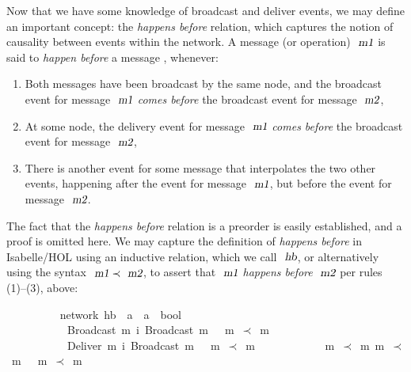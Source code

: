 \documentclass[acmlarge,review,anonymous]{acmart}\settopmatter{printfolios=true}
\begin{document}
Now that we have some knowledge of broadcast and deliver events, we may define an important concept: the \emph{happens before} relation, which captures the notion of causality between events within the network.
A message (or operation) $\isa{m1}$ is said to \emph{happen before} a message , whenever:
\begin{enumerate}
\item
Both messages have been broadcast by the same node, and the broadcast event for message $\isa{m1}$ \emph{comes before} the broadcast event for message $\isa{m2}$,
\item
At some node, the delivery event for message $\isa{m1}$ \emph{comes before} the broadcast event for message $\isa{m2}$,
\item
There is another event for some message that interpolates the two other events, happening after the event for message $\isa{m1}$, but before the event for message $\isa{m2}$.
\end{enumerate}
The fact that the \emph{happens before} relation is a preorder is easily established, and a proof is omitted here.
We may capture the definition of \emph{happens before} in Isabelle/HOL using an inductive relation, which we call $\isa{hb}$, or alternatively using the syntax $\isa{m1} \prec \isa{m2}$, to assert that $\isa{m1}$ \emph{happens before} $\isa{m2}$ per rules (1)--(3), above:
\\
\begin{isabellebody}
\ \ \ \ \ \ \ \  {\isacharparenleft}\ network{\isacharparenright}\ hb\ {\isacharcolon}{\isacharcolon}\ {\isachardoublequoteopen}{\isacharprime}a\ {\isasymRightarrow}\ {\isacharprime}a\ {\isasymRightarrow}\ bool{\isachardoublequoteclose}\ \isanewline
\ \ \ \ \ \ \ \ \ \ {\isachardoublequoteopen}{\isasymlbrakk}\ Broadcast\ m{}\ {\isasymsqsubset}\isactrlsup i\ Broadcast\ m{}\ {\isasymrbrakk}\ {\isasymLongrightarrow}\ m{}\ $\prec$\ m{}{\isachardoublequoteclose}\ {\isacharbar}\isanewline
\ \ \ \ \ \ \ \ \ \ {\isachardoublequoteopen}{\isasymlbrakk}\ Deliver\ m{}\ {\isasymsqsubset}\isactrlsup i\ Broadcast\ m{}\ {\isasymrbrakk}\ {\isasymLongrightarrow}\ m{}\ $\prec$\ m{}{\isachardoublequoteclose}\ {\isacharbar}\isanewline
\ \ \ \ \ \ \ \ \ \ {\isachardoublequoteopen}{\isasymlbrakk}\ m{}\ $\prec$\  m{}{\isacharsemicolon}\ m{}\ $\prec$\ m{}\ {\isasymrbrakk}\ {\isasymLongrightarrow}\ m{}\ $\prec$\ m{}{\isachardoublequoteclose}
\end{isabellebody}
\end{document}

